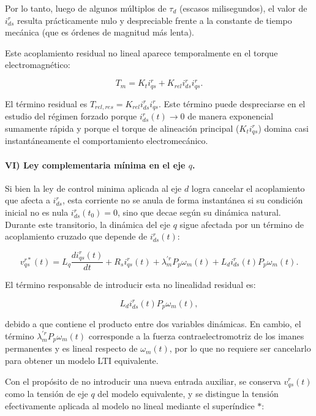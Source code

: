 \documentclass[10pt,a4paper]{article}
\begin{document}
Por lo tanto, luego de algunos múltiplos de $\tau_d$ (escasos milisegundos), 
el valor de $i_{ds}^r$ resulta prácticamente nulo y despreciable frente a la constante de tiempo mecánica (que es órdenes de magnitud más lenta).

Este acoplamiento residual no lineal aparece temporalmente en el torque electromagnético:

\begin{equation*}
    T_m = K_t i_{qs}^r + K_{rel} i_{ds}^r i_{qs}^r.
\end{equation*}

El término residual es $T_{rel,res} = K_{rel} i_{ds}^r i_{qs}^r$. 
Este término puede despreciarse en el estudio del régimen forzado porque $i_{ds}^r(t) \rightarrow 0$ de manera exponencial sumamente rápida y porque el torque de alineación principal ($K_t i_{qs}^r$) domina casi instantáneamente el comportamiento electromecánico.


\paragraph{VI) Ley complementaria mínima en el eje $q$.}
Si bien la ley de control minima aplicada al eje $d$ logra cancelar el acoplamiento que afecta a $i_{ds}^r$, 
esta corriente no se anula de forma instantánea si su condición inicial no es nula $i_{ds}^r(t_0)=0$, sino que decae según su dinámica natural. 
Durante este transitorio, la dinámica del eje $q$ sigue afectada por un término de acoplamiento cruzado que depende de $i_{ds}^r(t)$:

\begin{equation}
	v_{qs}^{r*}(t)
	=
	L_q\frac{di_{qs}^{r}(t)}{dt}
	+R_s i_{qs}^{r}(t)
	+\lambda_m^{\prime r}P_p\omega_m(t)
	+L_d i_{ds}^{r}(t)P_p\omega_m(t).
	\label{eq:iq_con_acople}
\end{equation}

El término responsable de introducir esta no linealidad residual es:

\begin{equation*}
	L_d i_{ds}^{r}(t)P_p\omega_m(t),
\end{equation*}

debido a que contiene el producto entre dos variables dinámicas. 
En cambio, el término $\lambda_m^{\prime r}P_p\omega_m(t)$ corresponde a la fuerza contraelectromotriz de los imanes permanentes 
y es lineal respecto de $\omega_m(t)$, por lo que no requiere ser cancelarlo para obtener un modelo LTI equivalente.

Con el propósito de no introducir una nueva entrada auxiliar, se conserva $v_{qs}^{r}(t)$ como la tensión de eje $q$ del modelo equivalente, 
y se distingue la tensión efectivamente aplicada al modelo no lineal mediante el superíndice $*$:
\end{document}
